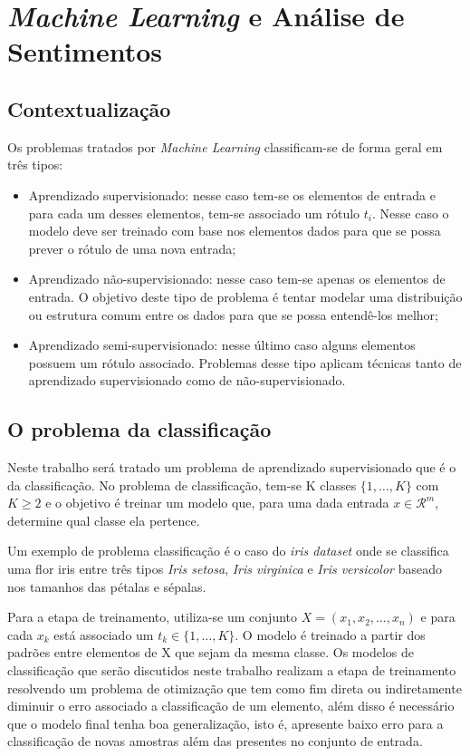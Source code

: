 \chapter{\textit{Machine Learning} e Análise de Sentimentos}

\section{Contextualização}
\label{sec:methods}

Os problemas tratados por \textit{Machine Learning} classificam-se de forma
geral em três tipos:

\begin{itemize}
	\item Aprendizado supervisionado: nesse caso tem-se os elementos de entrada e
	para cada um desses elementos, tem-se associado um rótulo $t_i$. Nesse caso o modelo
	deve ser treinado com base nos elementos dados para que se possa prever o rótulo %
	de uma nova entrada;
	\item Aprendizado não-supervisionado: nesse caso tem-se apenas os elementos de entrada. 
	O objetivo deste tipo de problema é tentar modelar uma distribuição ou estrutura comum
	entre os dados para que se possa entendê-los melhor;
	\item Aprendizado semi-supervisionado: nesse último caso alguns elementos possuem um rótulo
	associado. Problemas desse tipo aplicam técnicas tanto de aprendizado supervisionado como
	de não-supervisionado.
\end{itemize}

\section{O problema da classificação}

Neste trabalho será tratado um problema de aprendizado supervisionado que é o da classificação.
No problema de classificação, tem-se K classes $\{1, \ldots, K\}$ com $K \ge 2$ e o objetivo
é treinar um modelo que, para uma dada entrada $x \in \mathcal{R}^m$, determine qual classe ela
pertence.

Um exemplo de problema classificação é o caso do \textit{iris dataset} onde se classifica uma
flor iris entre três tipos \textit{Iris setosa}, \textit{Iris virginica} e \textit{Iris versicolor}
baseado nos tamanhos das pétalas e sépalas.

Para a etapa de treinamento, utiliza-se um conjunto $X = (x_1, x_2, \ldots, x_n)$ e para cada
$x_k$ está associado um $t_k \in \{1, \ldots, K\}$. O modelo é treinado a partir dos padrões
entre elementos de X que sejam da mesma classe.
Os modelos de classificação que serão discutidos neste trabalho realizam a etapa de treinamento
resolvendo um problema de otimização que tem como fim direta ou indiretamente diminuir o erro
associado a classificação de um elemento, além disso é necessário que o modelo final tenha
boa generalização, isto é, apresente baixo erro para a classificação de novas amostras além das
presentes no conjunto de entrada.

